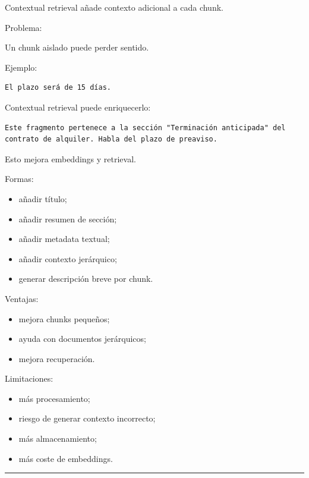 Contextual retrieval añade contexto adicional a cada chunk.

Problema:

Un chunk aislado puede perder sentido.

Ejemplo:

\begin{lstlisting}
El plazo será de 15 días.
\end{lstlisting}

Contextual retrieval puede enriquecerlo:

\begin{lstlisting}
Este fragmento pertenece a la sección "Terminación anticipada" del contrato de alquiler. Habla del plazo de preaviso.
\end{lstlisting}

Esto mejora embeddings y retrieval.

Formas:

\begin{itemize}
\tightlist
\item
  añadir título;
\item
  añadir resumen de sección;
\item
  añadir metadata textual;
\item
  añadir contexto jerárquico;
\item
  generar descripción breve por chunk.
\end{itemize}

Ventajas:

\begin{itemize}
\tightlist
\item
  mejora chunks pequeños;
\item
  ayuda con documentos jerárquicos;
\item
  mejora recuperación.
\end{itemize}

Limitaciones:

\begin{itemize}
\tightlist
\item
  más procesamiento;
\item
  riesgo de generar contexto incorrecto;
\item
  más almacenamiento;
\item
  más coste de embeddings.
\end{itemize}

\begin{center}\rule{0.5\linewidth}{0.5pt}\end{center}

